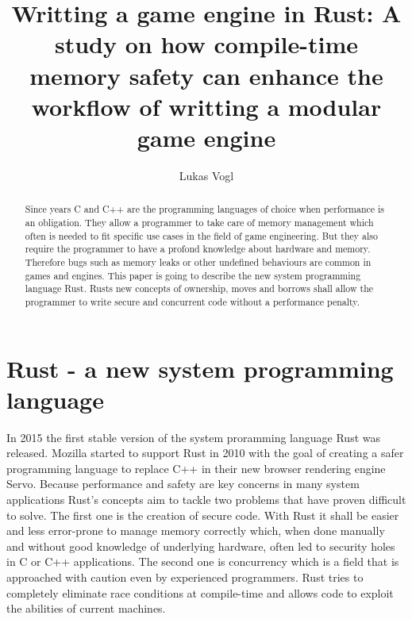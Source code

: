 \documentclass[lnbip]{svmultln}
\begin{document}
%
\mainmatter              %
%
\title{Writting a game engine in Rust: A study on how compile-time memory safety can enhance the workflow of writting a modular game engine}
%
%
\author{Lukas Vogl}
%
\maketitle              %

\begin{abstract}        %
Since years C and C++ are the programming languages of choice when performance is an obligation. They allow a programmer to take care of memory management which often is needed to fit specific use cases in the field of 
game engineering. But they also require the programmer to have a profond knowledge about hardware and memory. Therefore bugs such as memory leaks or other undefined behaviours are common in games and engines. This paper is going to describe the new system programming language Rust. Rusts new concepts of ownership, moves and borrows shall allow the programmer to write secure and concurrent code without a performance penalty. 
\end{abstract}
%
\section{Rust - a new system programming language}
%
In 2015 the first stable version of the system proramming language Rust was released. Mozilla started to support Rust in 2010 with the goal of creating a safer programming language to replace C++ in their new browser rendering engine Servo. Because performance and safety are key concerns in many system applications Rust's concepts aim to tackle two problems that have proven difficult to solve. The first one is the creation of secure code. With Rust it shall be easier and less error-prone to manage memory correctly which, when done manually and without good knowledge of underlying hardware, often led to security holes in C or C++ applications. The second one is concurrency which is a field that is approached with caution even by experienced programmers. Rust tries to completely eliminate race conditions at compile-time and allows code to exploit the abilities of current machines. \cite[Chapter 1. Why Rust?]{ProgrammingRust}
 
\end{document}

